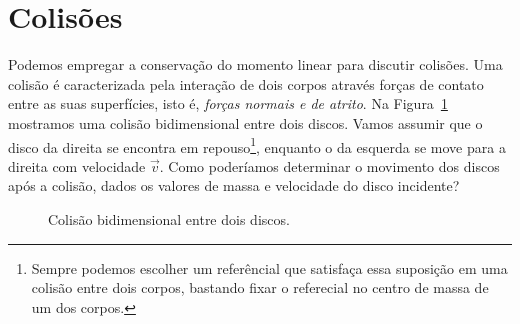 \section{Colisões}

Podemos empregar a conservação do momento linear para discutir colisões. Uma colisão é caracterizada pela interação de dois corpos através forças de contato entre as suas superfícies, isto é, \emph{forças normais e de atrito}. Na Figura~\ref{Fig:ColisaoEntreDoisDiscos} mostramos uma colisão bidimensional entre dois discos. Vamos assumir que o disco da direita se encontra em repouso\footnote{Sempre podemos escolher um referêncial que satisfaça essa suposição em uma colisão entre dois corpos, bastando fixar o referecial no centro de massa de um dos corpos.}, enquanto o da esquerda se move para a direita com velocidade $\vec{v}$. Como poderíamos determinar o movimento dos discos após a colisão, dados os valores de massa e velocidade do disco incidente?

\begin{figure}[!h]\forcerectofloat
\centering
{}
\caption{Colisão bidimensional entre dois discos. \label{Fig:ColisaoEntreDoisDiscos}}
\end{figure}

